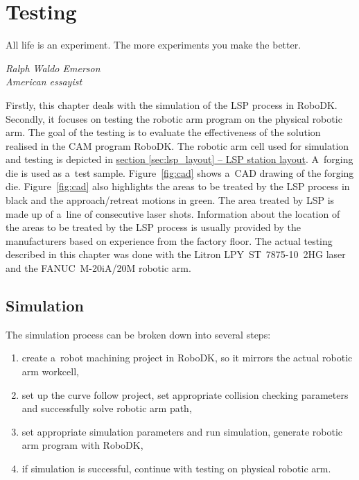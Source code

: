 \chapter{Testing \label{chap:testing}}

\label{chap:testing}

\epigraph{All life is an experiment. The more experiments you make the better.}{\textit{Ralph Waldo Emerson \\ American essayist }}

Firstly, this chapter deals with the simulation of the LSP process in RoboDK. Secondly, it focuses on testing the robotic arm program on the physical robotic arm. The goal of the testing is to evaluate the effectiveness of the solution realised in the CAM program RoboDK. The robotic arm cell used for simulation and testing is depicted in \hyperref[sec:lsp_layout]{section \ref{sec:lsp_layout} -- LSP station layout}. A~forging die is used as a~test sample. Figure~\ref{fig:cad} shows a~CAD drawing of the forging die. Figure~\ref{fig:cad} also highlights the areas to be treated by the LSP process in black and the approach/retreat motions in green. The area treated by LSP is made up of a~line of consecutive laser shots. Information about the location of the areas to be treated by the LSP process is usually provided by the manufacturers based on experience from the factory floor. The actual testing described in this chapter was done with the Litron LPY~ST~7875-10~2HG laser and the FANUC~M-20iA/20M robotic arm. 



\section{Simulation}

The simulation process can be broken down into several steps:

\begin{enumerate}

\item create a~robot machining project in RoboDK, so it mirrors the actual robotic arm workcell, 

\item set up the curve follow project, set appropriate collision checking parameters and successfully solve robotic arm path,

\item set appropriate simulation parameters and run simulation,
generate robotic arm program with RoboDK,

\item if simulation is successful, continue with testing on physical robotic arm.

\end{enumerate}

